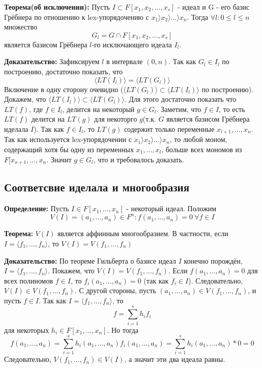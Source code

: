 \documentclass{article}
\begin{document}
    \textbf{Теорема(об исключении):} Пусть $I \subset F[x_1, x_2,\ldots, x_s]$ - идеал и G - его базис Грёбнера по отношению
    к lex-упорядочению с $x_1  \rangle  x_2  \rangle  \ldots  \rangle  x_n$. Тогда $\forall l : 0 \leq l \leq n $ множество
    $$G_l = G \cap F[x_1, x_2,\ldots,x_s]$$ является базисом Грёбнера $l$-го исключающего идеала $I_l$.
    
    \textbf{Доказательство:} 
     Зафиксируем $l$ в интервале $(0, n)$. Так как $G_l \in I_l$ по построению, достаточно показать, что 
     $$\langle LT(I_l) \rangle =\langle LT(G_l) \rangle $$ 
     Включение в одну сторону очевидно
     ($\langle LT(G_l) \rangle \subset \langle LT(I_l) \rangle $ по построению). Докажем, что $\langle LT(I_l) \rangle \subset \langle LT(G_l) \rangle $.
     Для этого достаточно показать что $LT(f)$, где $f \in I_l$, делится на некоторый $g \in G_l$. 
     Заметим, что $f \in I$, то есть $LT(f)$ делится на $LT(g)$ для некоторго $g$(т.к. $G$ является базисом Грёбнера иделала $I$). 
     Так как $f \in I_l$, то $LT(g)$ содержит только переменные $x_{l+1}, \ldots, x_n$. Так как используется lex-упорядочении с 
     $x_1  \rangle  x_2  \rangle  \ldots  \rangle  x_n$, то любой моном, содержащий хотя бы одну из переменных $x_1, \ldots, x_l$, больше всех мономов из
     $F[x_{x+1},\ldots, x_n$. Значит $g\in G_l$, что и требовалось доказать.
    \newpage

    \subsection{Соответсвие иделала и многообразия}

    \textbf{Определение:} Пусть $I \in F[x_1,\ldots, x_n]$ - некоторый идеал. Положим
    $$V(I) = {(a_1, \ldots, a_n) \in F^n : f(a_1, \ldots, a_n) = 0 \:\forall f \in I}$$

    \textbf{Теорема:} $V(I)$ является аффинным многообразием. В частности, если $I = \langle f_1, \ldots, f_n \rangle $, то $V(I) = V(f_1,\ldots,f_n)$

    \textbf{Доказательство:} По теореме Гильберта о базисе идеал $I$ конечно порождён, $I = \langle f_1, \ldots, f_n \rangle $. Покажем, что $V(I) = V(f_1,\ldots,f_n)$.
    Если $f(a_1,\ldots,a_n) = 0$ для всех полиномов $f \in I$, то $f_i(a_1,\ldots,a_n)=0$ (так как $f_i \in I$). Следовательно,
    $V(I) \in V(f_1,\ldots,f_n)$. С другой стороны, пусть $(a_1,\ldots,a_n) \in V(f_1,\ldots, f_n)$, и пусть $f\in I$.
    Так как $I = \langle f_1,\ldots, f_n \rangle $, то $$f = \sum_{i=1}^s h_if_i$$ для некоторых $h_i \in F[x_1, \ldots, x_n]$.
    Но тогда 
    $$f(a_1,\ldots,a_n)=\sum_{i=1}^s h_i(a_1,\ldots,a_n)f_i(a_1,\ldots,a_n)=\sum_{i=1}^s h_i(a_1,\ldots,a_n)*0 = 0$$
    Следовательно, $V(f_1, \ldots, f_n) \in V(I)$, а значит эти два идеала равны. 
\end{document}
